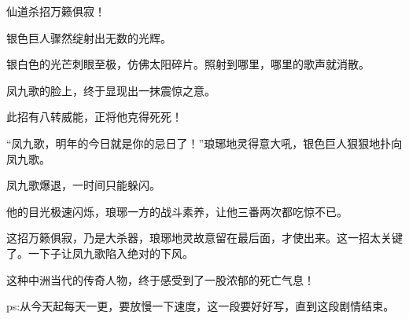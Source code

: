 \begin{this_body}
仙道杀招万籁俱寂！

银色巨人骤然绽射出无数的光辉。

银白色的光芒刺眼至极，仿佛太阳碎片。照射到哪里，哪里的歌声就消散。

凤九歌的脸上，终于显现出一抹震惊之意。

此招有八转威能，正将他克得死死！

“凤九歌，明年的今日就是你的忌日了！”琅琊地灵得意大吼，银色巨人狠狠地扑向凤九歌。

凤九歌爆退，一时间只能躲闪。

他的目光极速闪烁，琅琊一方的战斗素养，让他三番两次都吃惊不已。

这招万籁俱寂，乃是大杀器，琅琊地灵故意留在最后面，才使出来。这一招太关键了。一下子让凤九歌陷入绝对的下风。

这种中洲当代的传奇人物，终于感受到了一股浓郁的死亡气息！

ps:从今天起每天一更，要放慢一下速度，这一段要好好写，直到这段剧情结束。

\end{this_body}

